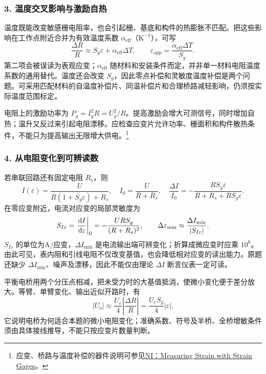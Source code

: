 \subsubsection*{3. 温度交叉影响与激励自热}
温度既能改变敏感栅电阻率，也会引起栅、基底和构件的热膨胀不匹配。把这些影响在工作点附近合并为有效温度系数 $\alpha_{\mathrm{eff}}$（$\mathrm K^{-1}$），可写
\[
\frac{\Delta R}{R}\approx S_g\varepsilon+
\alpha_{\mathrm{eff}}\Delta T,\qquad
\varepsilon_{\mathrm{app}}=\frac{\alpha_{\mathrm{eff}}\Delta T}{S_g}.
\]
第二项会被误读为表观应变；$\alpha_{\mathrm{eff}}$ 随材料和安装条件而定，并非单一材料电阻温度系数的通用替代。温度还会改变 $S_g$，因此零点补偿和灵敏度温度补偿是两个问题。可采用匹配材料的自温度补偿片、同温补偿片和合理桥路减轻影响，仍须按实际温度范围标定。

电阻上的激励功率为 $P_g=I_g^2R=U_g^2/R$。提高激励会增大可测信号，同时增加自热；温升又反过来引起电阻漂移。应检查应变片允许功率、栅面积和构件散热条件，不能只为提高输出无限增大供电。\footnote{应变、桥路与温度补偿的器件说明可参见\href{https://www.ni.com/en/shop/data-acquisition/sensor-fundamentals/measuring-strain-with-strain-gages.html}{NI：Measuring Strain with Strain Gages}。}

\subsubsection*{4. 从电阻变化到可辨读数}
若串联回路还有固定电阻 $R_s$，则
\[
I(\varepsilon)=\frac{U}{R(1+S_g\varepsilon)+R_s},\quad
I_0=\frac{U}{R+R_s},\quad
\frac{\Delta I}{I_0}=-\frac{RS_g\varepsilon}{R+R_s+RS_g\varepsilon}.
\]
在零应变附近，电流对应变的局部灵敏度为
\[
S_{I\varepsilon}=\left.\frac{\mathrm{d} I}{\mathrm{d}\varepsilon}\right|_0
=-\frac{URS_g}{(R+R_s)^2},\qquad
\Delta\varepsilon_{\min}\approx\frac{\Delta I_{\min}}{|S_{I\varepsilon}|}.
\]
$S_{I\varepsilon}$ 的单位为A/应变，$\Delta I_{\min}$ 是电流输出端可辨变化；折算成微应变时应乘 $10^6$。由此可见，表内阻和引线电阻不仅改变基值，也会降低相对应变的读出能力。原题还缺少 $\Delta I_{\min}$、噪声及漂移，因此不能仅由理论 $\Delta I$ 断言仪表一定可读。

平衡电桥用两个分压点相减，把未受力时的大基值抵消，使微小变化便于差分放大。等臂、单臂变化、输出近似开路时，有
\[
|U_o|\approx\frac{U_e}{4}\left|\frac{\Delta R}{R}\right|
=\frac{U_eS_g}{4}|\varepsilon|.
\]
它说明电桥为何适合本题的微小电阻变化；准确系数、符号及半桥、全桥增敏条件须由具体接线推导，不能只按应变片数量判断。

